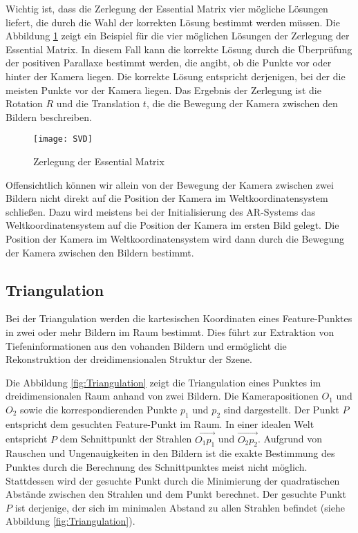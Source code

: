 Wichtig ist, dass die Zerlegung der Essential Matrix vier mögliche Lösungen liefert, die durch die Wahl der korrekten Lösung bestimmt werden müssen. Die Abbildung \ref{fig:SVD} zeigt ein Beispiel für die vier möglichen Lösungen der Zerlegung der Essential Matrix. In diesem Fall kann die korrekte Lösung durch die Überprüfung der positiven Parallaxe bestimmt werden, die angibt, ob die Punkte vor oder hinter der Kamera liegen. Die korrekte Lösung entspricht derjenigen, bei der die meisten Punkte vor der Kamera liegen. Das Ergebnis der Zerlegung ist die Rotation \( R \) und die Translation \( t \), die die Bewegung der Kamera zwischen den Bildern beschreiben.

\begin{figure}
    \centering
    \texttt{[image: SVD]}
    \caption{Zerlegung der Essential Matrix\label{fig:SVD}}\par
\end{figure}

Offensichtlich können wir allein von der Bewegung der Kamera zwischen zwei Bildern nicht direkt auf die Position der Kamera im Weltkoordinatensystem schließen. Dazu wird meistens bei der Initialisierung des AR-Systems das Weltkoordinatensystem auf die Position der Kamera im ersten Bild gelegt. Die Position der Kamera im Weltkoordinatensystem wird dann durch die Bewegung der Kamera zwischen den Bildern bestimmt.

\subsection{Triangulation}

Bei der Triangulation werden die kartesischen Koordinaten eines Feature-Punktes in zwei oder mehr Bildern im Raum bestimmt. Dies führt zur Extraktion von Tiefeninformationen aus den vohanden Bildern und ermöglicht die Rekonstruktion der dreidimensionalen Struktur der Szene. 

Die Abbildung \ref{fig:Triangulation} zeigt die Triangulation eines Punktes im dreidimensionalen Raum anhand von zwei Bildern. Die Kamerapositionen \( O_1 \) und \( O_2 \) sowie die korrespondierenden Punkte \( p_1 \) und \( p_2 \) sind dargestellt. Der Punkt \( P \) entspricht dem gesuchten Feature-Punkt im Raum. In einer idealen Welt entspricht \( P \) dem Schnittpunkt der Strahlen \( \overrightarrow{O_1p_1} \) und \( \overrightarrow{O_2p_2} \). Aufgrund von Rauschen und Ungenauigkeiten in den Bildern ist die exakte Bestimmung des Punktes durch die Berechnung des Schnittpunktes meist nicht möglich. Stattdessen wird der gesuchte Punkt durch die Minimierung der quadratischen Abstände zwischen den Strahlen und dem Punkt berechnet. Der gesuchte Punkt \( P \) ist derjenige, der sich im minimalen Abstand zu allen Strahlen befindet (siehe Abbildung \ref{fig:Triangulation}).


